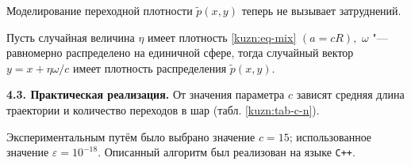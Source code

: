     Моделирование переходной плотности $\tilde p(x, y)$ теперь не вызывает затруднений.



    \begin{lemma}{}

        Пусть случайная величина $\eta$ имеет плотность \eqref{kuzn:eq-mix} $(a=cR),$ $\omega$ "--- равномерно распределено на единичной сфере{\rm ,} тогда случайный вектор $y=x+{\eta}\omega/c$ имеет плотность распределения $\tilde p(x, y)${\rm .}

    \end{lemma}



\smallskip



{\bf 4.3. Практическая реализация.} От значения параметра $c$ зависят средняя длина траектории и количество переходов в шар (табл. \ref{kuzn:tab-c-n}). 

Экспериментальным путём было выбрано значение $c=15$; использованное значение $\varepsilon=10^{-18}$. Описанный алгоритм был реализован на языке {\tt C++}.



